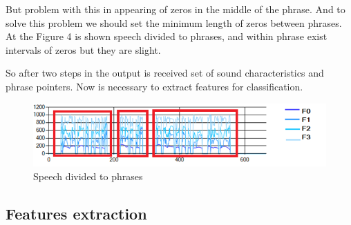 \documentclass[14pt]{extarticle}
\begin{document}
But problem with this in appearing of zeros in the middle of
the phrase. And to solve this problem we should set the minimum length of zeros between phrases. At the Figure 4 is shown speech divided to phrases, and within phrase exist intervals of zeros but they are slight. 

So after two steps in the output is received set of sound characteristics and phrase pointers. Now is necessary to extract features for classification.
\begin{figure}
	\centering
		\includegraphics[scale=1]{images/phrases.png}
	\caption{Speech divided to phrases}
	\label{fig:phrases}
\end{figure}


\subsection{Features extraction}
\end{document}
